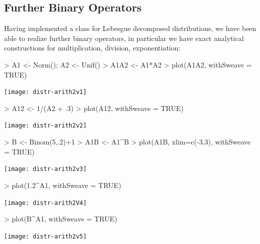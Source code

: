 \documentclass[11pt]{article}
\begin{document}
\subsection{Further Binary Operators}
%
Having implemented a class for Lebesgue decomposed distributions, we have been
able to realize further binary operators, in particular we have exact
analytical constructions for multiplication, division, exponentiation:
\begin{Schunk}
\begin{Sinput}
>   A1 <- Norm(); A2 <- Unif()
>   A1A2 <- A1*A2
>   plot(A1A2, withSweave = TRUE)
\end{Sinput}
\end{Schunk}
\texttt{[image: distr-arith2v1]}
\begin{Schunk}
\begin{Sinput}
>   A12 <- 1/(A2 + .3)
>   plot(A12, withSweave = TRUE)
\end{Sinput}
\end{Schunk}
\texttt{[image: distr-arith2v2]}
\begin{Schunk}
\begin{Sinput}
>   B <- Binom(5,.2)+1
>   A1B <- A1^B
>   plot(A1B, xlim=c(-3,3), withSweave = TRUE)
\end{Sinput}
\end{Schunk}
\texttt{[image: distr-arith2v3]}
\begin{Schunk}
\begin{Sinput}
>   plot(1.2^A1, withSweave = TRUE)
\end{Sinput}
\end{Schunk}
\texttt{[image: distr-arith2V4]}
\begin{Schunk}
\begin{Sinput}
>   plot(B^A1, withSweave = TRUE)
\end{Sinput}
\end{Schunk}
\texttt{[image: distr-arith2v5]}
%
\end{document}
